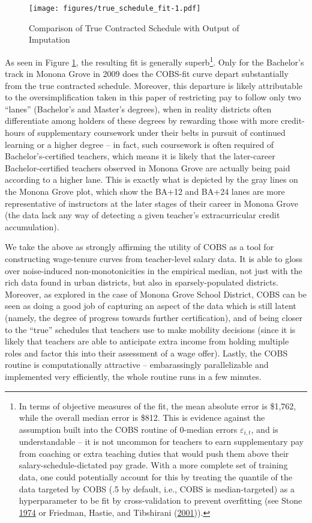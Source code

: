 \documentclass[12pt,]{article}
\let\rmarkdownfootnote\footnote%
\def\footnote{\protect\rmarkdownfootnote}
\begin{document}
\begin{figure}[htbp]
\centering
\texttt{[image: figures/true\_schedule\_fit-1.pdf]}
\caption{\label{fig:true_fit}Comparison of True Contracted Schedule with
Output of Imputation}
\end{figure}

As seen in Figure \ref{fig:true_fit}, the resulting fit is generally
superb\footnote{In terms of objective measures of the fit, the mean
  absolute error is \$1,762, while the overall median error is \$812.
  This is evidence against the assumption built into the COBS routine of
  0-median errors \(\varepsilon_{i, t}\), and is understandable -- it is
  not uncommon for teachers to earn supplementary pay from coaching or
  extra teaching duties that would push them above their
  salary-schedule-dictated pay grade. With a more complete set of
  training data, one could potentially account for this by treating the
  quantile of the data targeted by COBS (.5 by default, i.e., COBS is
  median-targeted) as a hyperparameter to be fit by cross-validation to
  prevent overfitting (see Stone \protect\hyperlink{ref-stone}{1974} or
  Friedman, Hastie, and Tibshirani
  (\protect\hyperlink{ref-friedman}{2001})).}. Only for the Bachelor's
track in Monona Grove in 2009 does the COBS-fit curve depart
substantially from the true contracted schedule. Moreover, this
departure is likely attributable to the oversimplification taken in this
paper of restricting pay to follow only two ``lanes'' (Bachelor's and
Master's degrees), when in reality districts often differentiate among
holders of these degrees by rewarding those with more credit-hours of
supplementary coursework under their belts in pursuit of continued
learning or a higher degree -- in fact, such coursework is often
required of Bachelor's-certified teachers, which means it is likely that
the later-career Bachelor-certified teachers observed in Monona Grove
are actually being paid according to a higher lane. This is exactly what
is depicted by the gray lines on the Monona Grove plot, which show the
BA+12 and BA+24 lanes are more representative of instructors at the
later stages of their career in Monona Grove (the data lack any way of
detecting a given teacher's extracurricular credit accumulation).

We take the above as strongly affirming the utility of COBS as a tool
for constructing wage-tenure curves from teacher-level salary data. It
is able to gloss over noise-induced non-monotonicities in the empirical
median, not just with the rich data found in urban districts, but also
in sparsely-populated districts. Moreover, as explored in the case of
Monona Grove School District, COBS can be seen as doing a good job of
capturing an aspect of the data which is still latent (namely, the
degree of progress towards further certification), and of being closer
to the ``true'' schedules that teachers use to make mobility decisions
(since it is likely that teachers are able to anticipate extra income
from holding multiple roles and factor this into their assessment of a
wage offer). Lastly, the COBS routine is computationally attractive --
embarassingly parallelizable and implemented very efficiently, the whole
routine runs in a few minutes.
\end{document}
